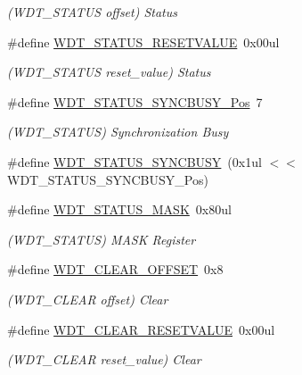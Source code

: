 \begin{DoxyCompactItemize}
\begin{DoxyCompactList}\small\item\em (W\+D\+T\+\_\+\+S\+T\+A\+T\+US offset) Status \end{DoxyCompactList}\item 
\#define \mbox{\hyperlink{group___s_a_m_d21___w_d_t_ga7a68bc75c4153366852382d40bf13c01}{W\+D\+T\+\_\+\+S\+T\+A\+T\+U\+S\+\_\+\+R\+E\+S\+E\+T\+V\+A\+L\+UE}}~0x00ul
\begin{DoxyCompactList}\small\item\em (W\+D\+T\+\_\+\+S\+T\+A\+T\+US reset\+\_\+value) Status \end{DoxyCompactList}\item 
\#define \mbox{\hyperlink{group___s_a_m_d21___w_d_t_gaf075cb0b6a541d650863f51dedf17630}{W\+D\+T\+\_\+\+S\+T\+A\+T\+U\+S\+\_\+\+S\+Y\+N\+C\+B\+U\+S\+Y\+\_\+\+Pos}}~7
\begin{DoxyCompactList}\small\item\em (W\+D\+T\+\_\+\+S\+T\+A\+T\+US) Synchronization Busy \end{DoxyCompactList}\item 
\#define \mbox{\hyperlink{group___s_a_m_d21___w_d_t_gac27ae5cfb6b11ab496f06fc473905ceb}{W\+D\+T\+\_\+\+S\+T\+A\+T\+U\+S\+\_\+\+S\+Y\+N\+C\+B\+U\+SY}}~(0x1ul $<$$<$ W\+D\+T\+\_\+\+S\+T\+A\+T\+U\+S\+\_\+\+S\+Y\+N\+C\+B\+U\+S\+Y\+\_\+\+Pos)
\item 
\#define \mbox{\hyperlink{group___s_a_m_d21___w_d_t_ga363d7548ef5d950b2292c611cc4ace0b}{W\+D\+T\+\_\+\+S\+T\+A\+T\+U\+S\+\_\+\+M\+A\+SK}}~0x80ul
\begin{DoxyCompactList}\small\item\em (W\+D\+T\+\_\+\+S\+T\+A\+T\+US) M\+A\+SK Register \end{DoxyCompactList}\item 
\#define \mbox{\hyperlink{group___s_a_m_d21___w_d_t_gaf1f57bd7a1a8ce2ae94864a7cea2e6e4}{W\+D\+T\+\_\+\+C\+L\+E\+A\+R\+\_\+\+O\+F\+F\+S\+ET}}~0x8
\begin{DoxyCompactList}\small\item\em (W\+D\+T\+\_\+\+C\+L\+E\+AR offset) Clear \end{DoxyCompactList}\item 
\#define \mbox{\hyperlink{group___s_a_m_d21___w_d_t_ga9192db22a2c21f7afda2b8117a96d6ef}{W\+D\+T\+\_\+\+C\+L\+E\+A\+R\+\_\+\+R\+E\+S\+E\+T\+V\+A\+L\+UE}}~0x00ul
\begin{DoxyCompactList}\small\item\em (W\+D\+T\+\_\+\+C\+L\+E\+AR reset\+\_\+value) Clear \end{DoxyCompactList}\item 
$$
\end{DoxyCompactItemize}
